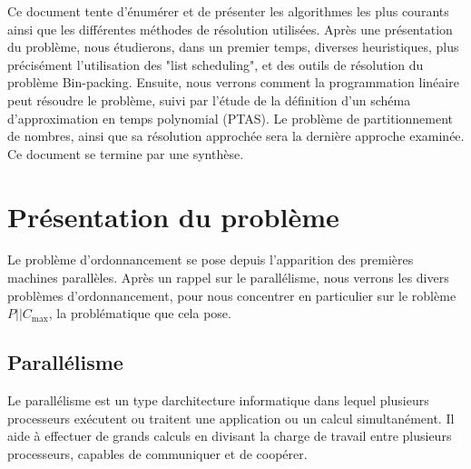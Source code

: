 \documentclass[a4paper,12pt]{report}
\theoremstyle{plain}				%
\theoremstyle{definition}				%
\newcommand\problemGrahamP{$P||C_{\max}$\xspace}
\begin{document}
Ce document tente d’énumérer et de présenter les algorithmes les plus courants ainsi que les différentes méthodes de résolution utilisées.
Après une présentation du problème, 
nous étudierons, dans un premier temps, diverses heuristiques, 
plus précisément l'utilisation des "list scheduling", 
et des outils de résolution du problème Bin-packing. 
Ensuite, nous verrons  comment la programmation linéaire peut résoudre le problème, 
suivi par l'étude de la définition d'un schéma d'approximation en temps polynomial (PTAS). 
Le problème de partitionnement de nombres, ainsi que sa résolution approchée sera la dernière approche examinée. Ce document se termine par une synthèse. 


\section{Présentation du problème}

Le problème d'ordonnancement se pose depuis l'apparition des premières machines parallèles. Après un rappel sur le parallélisme, nous verrons les divers problèmes d'ordonnancement, pour nous concentrer en particulier sur le roblème \problemGrahamP, la problématique que cela pose.


\subsection{Parallélisme}
Le parallélisme est un type d{\textquotesingle}architecture informatique
dans lequel plusieurs processeurs exécutent ou traitent une application
ou un calcul simultanément. Il aide à effectuer de grands calculs en
divisant la charge de travail entre plusieurs processeurs, capables de communiquer et de coopérer.
\end{document}
